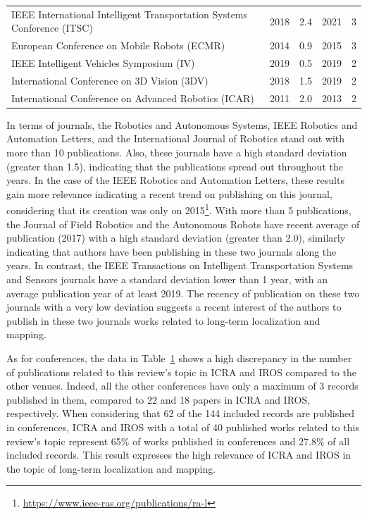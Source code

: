 \begin{table}[!h]
{\begin{tabular}{p{}cccc}
IEEE International Intelligent Transportation Systems Conference (ITSC) & 2018 & 2.4 & 2021 & 3\\
European Conference on Mobile Robots (ECMR) & 2014 & 0.9 & 2015 & 3\\
IEEE Intelligent Vehicles Symposium (IV) & 2019 & 0.5 & 2019 & 2\\
International Conference on 3D Vision (3DV) & 2018 & 1.5 & 2019 & 2\\
International Conference on Advanced Robotics (ICAR) & 2011 & 2.0 & 2013 & 2\\
\hline
  \end{tabular}\label{tab:overview:publication:conference}%
  }
\end{table}

In terms of journals, the Robotics and Autonomous Systems, IEEE Robotics and Automation Letters, and the International Journal of Robotics stand out with more than 10 publications. Also, these journals have a high standard deviation (greater than 1.5), indicating that the publications spread out throughout the years.
In the case of the IEEE Robotics and Automation Letters, these results gain more relevance indicating a recent trend on publishing on this journal, considering that its creation was only on 2015\footnote{\url{https://www.ieee-ras.org/publications/ra-l}}.
With more than 5 publications, the Journal of Field Robotics and the Autonomous Robots have recent average of publication (2017) with a high standard deviation (greater than 2.0), similarly indicating that authors have been publishing in these two journals along the years.
In contrast, the IEEE Transactions on Intelligent Transportation Systems and Sensors journals have a standard deviation lower than 1 year, with an average publication year of at least 2019. The recency of publication on these two journals with a very low deviation suggests a recent interest of the authors to publish in these two journals works related to long-term localization and mapping.

As for conferences, the data in Table~\ref{tab:overview:publication:conference} shows a high discrepancy in the number of publications related to this review's topic in ICRA and IROS compared to the other venues. Indeed, all the other conferences have only a maximum of 3 records published in them, compared to 22 and 18 papers in ICRA and IROS, respectively. When considering that 62 of the 144 included records are published in conferences, ICRA and IROS with a total of 40 published works related to this review's topic represent 65\% of works published in conferences and 27.8\% of all included records. This result expresses the high relevance of ICRA and IROS in the topic of long-term localization and mapping.

